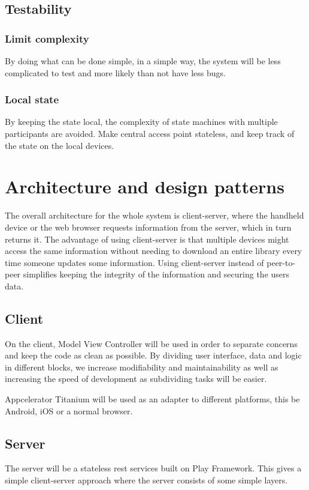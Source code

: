 \documentclass[11pt]{book}
\begin{document}
\subsection{Testability}

\subsubsection{Limit complexity}
By doing what can be done simple, in a simple way, the system will be less complicated to test and more likely than not have less bugs.

\subsubsection{Local state}
By keeping the state local, the complexity of state machines with multiple participants are avoided. Make central access point stateless, and keep track of the state on the local devices.

\section{Architecture and design patterns}

The overall architecture for the whole system is client-server, where the handheld device or the web browser requests information from the server, which in turn returns it. The advantage of using client-server is that multiple devices might access the same information without needing to download an entire library every time someone updates some information. Using client-server instead of peer-to-peer simplifies keeping the integrity of the information and securing the users data.

\subsection{Client}
On the client, Model View Controller will be used in order to separate concerns and keep the code as clean as possible. By dividing user interface, data and logic in different blocks, we increase modifiability and maintainability as well as increasing the speed of development as subdividing tasks will be easier.

Appcelerator Titanium will be used as an adapter to different platforms, this be Android, iOS or a normal browser.

\subsection{Server}
The server will be a stateless \gls{rest} services built on Play Framework. This gives a simple client-server approach where the server consists of some simple layers.
\end{document}
